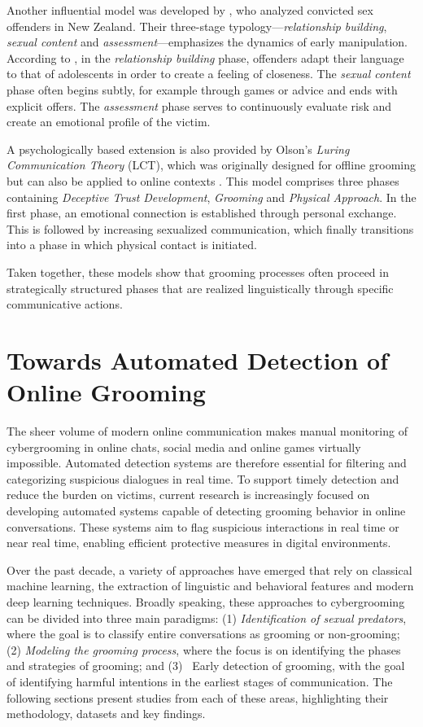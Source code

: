Another influential model was developed by \textcite{williamsmodel}, who analyzed convicted sex offenders in New Zealand. Their three-stage typology—\emph{relationship building}, \emph{sexual content} and \emph{assessment}—emphasizes the dynamics of early manipulation. According to \textcite{williamsmodel}, in the \emph{relationship building} phase, offenders adapt their language to that of adolescents in order to create a feeling of closeness. The \emph{sexual content} phase often begins subtly, for example through games or advice and ends with explicit offers. The \emph{assessment} phase serves to continuously evaluate risk and create an emotional profile of the victim.

A psychologically based extension is also provided by Olson's \emph{Luring Communication Theory} (LCT), which was originally designed for offline grooming but can also be applied to online contexts \parencite{Cano2014}. This model comprises three phases containing \emph{Deceptive Trust Development}, \emph{Grooming} and \emph{Physical Approach}. In the first phase, an emotional connection is established through personal exchange. This is followed by increasing sexualized communication, which finally transitions into a phase in which physical contact is initiated.

Taken together, these models show that grooming processes often proceed in strategically structured phases that are realized linguistically through specific communicative actions. %

\section{Towards Automated Detection of Online Grooming}

The sheer volume of modern online communication makes manual monitoring of cybergrooming in online chats, social media and online games virtually impossible. Automated detection systems are therefore essential for filtering and categorizing suspicious dialogues in real time. \cite{hamm2025llms}
To support timely detection and reduce the burden on victims, current research is increasingly focused on developing automated systems capable of detecting grooming behavior in online conversations. These systems aim to flag suspicious interactions in real time or near real time, enabling efficient protective measures in digital environments.

Over the past decade, a variety of approaches have emerged that rely on classical machine learning, the extraction of linguistic and behavioral features and modern deep learning techniques. Broadly speaking, these approaches to cybergrooming can be divided into three main paradigms: (1) \textit{Identification of sexual predators}, where the goal is to classify entire conversations as grooming or non-grooming; (2) \textit{Modeling the grooming process}, where the focus is on identifying the phases and strategies of grooming; and (3) \ Early detection of grooming, with the goal of identifying harmful intentions in the earliest stages of communication. The following sections present studies from each of these areas, highlighting their methodology, datasets and key findings. %


